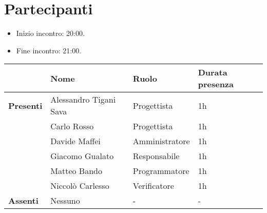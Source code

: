\section*{Partecipanti}

\begin{itemize}
	\item Inizio incontro: 20:00.
	\item Fine incontro: 21:00.
\end{itemize}


\begin{center}
	\begin{tabular}{llll}
		                  & \textbf{Nome}          & \textbf{Ruolo} & \textbf{Durata presenza} \\
		\hline
		\textbf{Presenti} & Alessandro Tigani Sava & Progettista 	& 1h	\\
		                  & Carlo Rosso            & Progettista	& 1h	\\
		                  & Davide Maffei          & Amministratore	& 1h	\\
		                  & Giacomo Gualato        & Responsabile	& 1h	\\
		                  & Matteo Bando           & Programmatore	& 1h	\\
		                  & Niccolò Carlesso       & Verificatore	& 1h	\\
		\hline
		\textbf{Assenti}  & Nessuno                & -              & -		\\
	\end{tabular}
\end{center}
